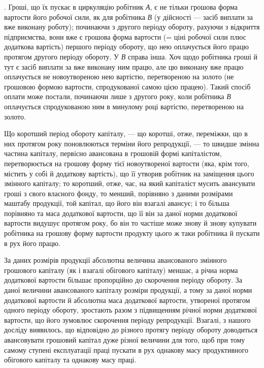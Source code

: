 . Гроші, що їх пускає в циркуляцію робітник \emph{А}, є не
тільки грошова форма вартости його робочої сили, як для робітника \emph{В}
(у дійсності — засіб виплати за вже виконану роботу); починаючи з другого
періоду обороту, рахуючи з відкриття підприємства, вони вже є
грошова форма  вартости (= ціні робочої
сили плюс додаткова вартість) першого періоду обороту, що нею
оплачується його працю протягом другого періоду обороту. У \emph{В} справа
інша. Хоч щодо робітника гроші й тут є засіб виплати за вже виконану
ним працю, але цю виконану вже працю оплачується не новоутвореною
нею вартістю, перетвореною на золото (не грошовою формою вартости,
спродукованої самою цією працею). Такий спосіб оплати може постали,
починаючи лише з другого року, коли робітника \emph{В} оплачується спродукованою
ним в минулому році вартістю, перетвореною на золото.

Що коротший період обороту капіталу, — що коротші, отже, переміжки,
що в них протягом року поновлюються терміни його репродукції, —
то швидше змінна частина капіталу, первісно авансована в грошовій формі
капіталістом, перетворюється на грошову форму тієї новоутвореної
вартости (яка, крім того, містить у собі й додаткову вартість), що її
утворив робітник на заміщення цього змінного капіталу; то коротший,
отже, час, на який капіталіст мусить авансувати гроші з свого власного
фонду, то менший, порівняно з даними розмірами маштабу продукції, той
капітал, що його він взагалі авансує; і то більша порівняно та маса додаткової
вартости, що її він за даної норми додаткової вартости видушує
протягом року, бо він то частіше може знову й знову купувати
робітника на грошову форму вартости продукту цього ж таки робітника
й пускати в рух його працю.

За даних розмірів продукції абсолютна величина авансованого змінного
грошового капіталу (як і взагалі обігового капіталу) меншає, а річна
норма додаткової вартости більшає пропорційно до скорочення періоду
обороту. За даної величини авансованого капіталу розміри продукції,
а тому за даної норми додаткової вартости й абсолютна маса додаткової
вартости, утвореної протягом одного періоду обороту, зростають разом
з підвищенням річної норми додаткової вартости, що його зумовлює
скорочення періоду репродукції. Взагалі, з нашого досліду виявилось, що
відповідно до різного протягу періоду обороту доводиться авансовувати грошовий
капітал дуже різної величини для того, щоб при тому самому
ступені експлуатації праці пускати в рух однакову масу продуктивного
обігового капіталу та однакову масу праці.

